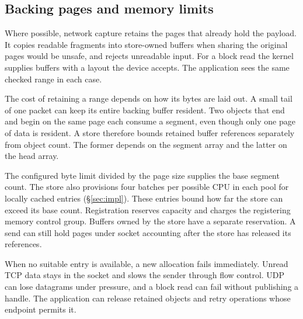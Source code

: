 \subsection{Backing pages and memory limits}
\label{sec:named:memory}

Where possible, network capture retains the pages that already hold the
payload. It copies readable fragments into store-owned buffers when sharing
the original pages would be unsafe, and rejects unreadable input. For a block
read the kernel supplies buffers with a layout the device accepts. The
application sees the same checked range in each case.

The cost of retaining a range depends on how its bytes are laid out. A small
tail of one packet can keep its entire backing buffer resident. Two objects
that end and begin on the same page each consume a segment, even though only
one page of data is resident. A store therefore bounds retained buffer
references separately from object count. The former depends on the segment
array and the latter on the head array.

The configured byte limit divided by the page size supplies the base segment
count. The store also provisions four batches per possible CPU in each pool
for locally cached entries (\S\ref{sec:impl}). These entries bound how far
the store can exceed its base count. Registration reserves capacity and
charges the registering memory control group. Buffers owned by the store
have a separate reservation. A send can still hold pages under socket
accounting after the store has released its references.

When no suitable entry is available, a new allocation fails immediately.
Unread TCP data stays in the socket and slows the sender through flow
control. UDP can lose datagrams under pressure, and a block read can fail
without publishing a handle. The application can release retained objects
and retry operations whose endpoint permits it.
